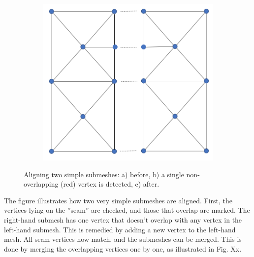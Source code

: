 \documentclass{article}
\begin{document}
\begin{figure}[H]
\begin{subfigure}[b]{0.3\linewidth}
    \caption{}
  \end{subfigure}
  \begin{subfigure}[b]{0.3\linewidth}
    \includegraphics[width=\linewidth]{Fig_mesh_align_03.png}
    \caption{}
  \end{subfigure}
  \caption{Aligning two simple submeshes: a) before, b) a single non-overlapping (red) vertex is detected, c) after.}
\end{figure}

The figure illustrates how two very simple submeshes are aligned. First, the vertices lying on the ''seam'' are checked, and those that overlap are marked. The right-hand submesh has one vertex that doesn't overlap with any vertex in the left-hand submesh. This is remedied by adding a new vertex to the left-hand mesh. All seam vertices now match, and the submeshes can be merged. This is done by merging the overlapping vertices one by one, as illustrated in Fig. Xx.
\end{document}
